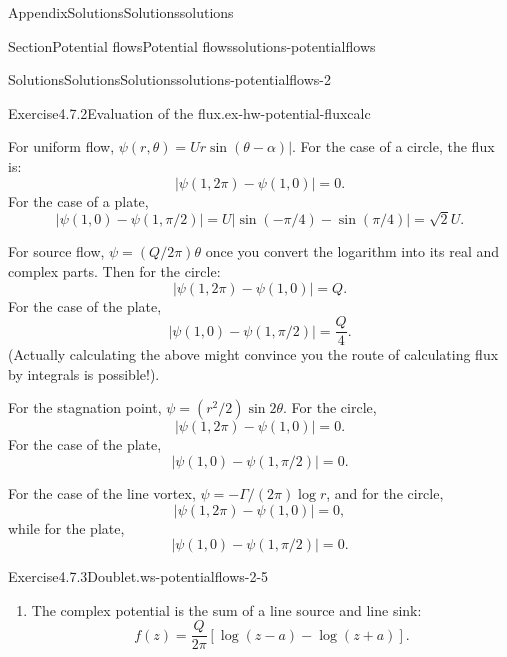 \documentclass[oneside,10pt,]{book}
\numberwithin{equation}{section}
\begin{document}
\begin{appendixptx}{Appendix}{Solutions}{}{Solutions}{}{}{solutions}
\begin{sectionptx}{Section}{Potential flows}{}{Potential flows}{}{}{solutions-potentialflows}
\begin{solutions-subsection-numberless}{Solutions}{Solutions}{}{Solutions}{}{}{solutions-potentialflows-2}
\begin{exercisegroup}
\begin{divisionsolutioneg}{Exercise}{4.7.2}{Evaluation of the flux.}{ex-hw-potential-fluxcalc}
\par
For uniform flow, \(\psi(r, \theta) = Ur \sin(\theta - \alpha)|\). For the case of a circle, the flux is:%
\begin{equation*}
|\psi(1, 2\pi) - \psi(1, 0)| = 0.
\end{equation*}
For the case of a plate,%
\begin{equation*}
|\psi(1, 0) - \psi(1, \pi/2)| = U|\sin(-\pi/4) - \sin(\pi/4)| = \sqrt{2}U.
\end{equation*}
%
\par
For source flow, \(\psi = (Q/2\pi) \theta\) once you convert the logarithm into its real and complex parts. Then for the circle:%
\begin{equation*}
|\psi(1, 2\pi) - \psi(1, 0)| = Q.
\end{equation*}
For the case of the plate,%
\begin{equation*}
|\psi(1, 0) - \psi(1, \pi/2)| = \frac{Q}{4}.
\end{equation*}
(Actually calculating the above might convince you the route of calculating flux by integrals is possible!).%
\par
For the stagnation point, \(\psi = (r^2/2)\sin 2\theta\). For the circle,%
\begin{equation*}
|\psi(1, 2\pi) - \psi(1, 0)| = 0.
\end{equation*}
For the case of the plate,%
\begin{equation*}
|\psi(1, 0) - \psi(1, \pi/2)| = 0.
\end{equation*}
%
\par
For the case of the line vortex, \(\psi = -\Gamma/(2\pi)\log r\), and for the circle,%
\begin{equation*}
|\psi(1, 2\pi) - \psi(1, 0)| = 0,
\end{equation*}
while for the plate,%
\begin{equation*}
|\psi(1, 0) - \psi(1, \pi/2)| = 0.
\end{equation*}
%
\end{divisionsolutioneg}%
\begin{divisionsolutioneg}{Exercise}{4.7.3}{Doublet.}{ws-potentialflows-2-5}%
\begin{enumerate}[font=\bfseries,label=(\alph*),ref=\alph*]%
\item[(a)]\noindent\hypertarget{ws-potentialflows-2-5-3-2-main}{}The complex potential is the sum of a line source and line sink:%
\begin{equation*}
f(z) = \frac{Q}{2\pi} [\log(z - a) - \log(z + a)].

\end{equation*}
\end{enumerate}
\end{divisionsolutioneg}
\end{exercisegroup}
\end{solutions-subsection-numberless}
\end{sectionptx}
\end{appendixptx}
\end{document}
